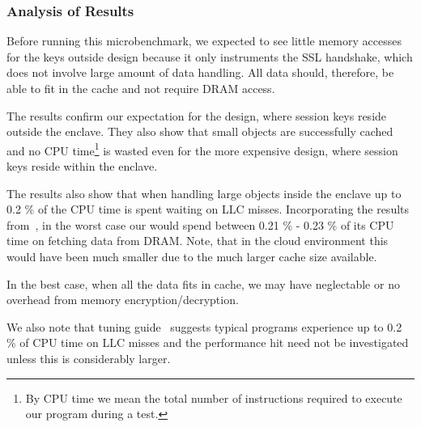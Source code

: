 \documentclass[../../../main.tex]{subfiles}
\begin{document}
\subsubsection*{Analysis of Results}
Before running this microbenchmark, we expected to see little memory
accesses for the keys outside design because it only instruments the SSL
handshake, which does not involve large amount of data handling. All data
should, therefore, be able to fit in the cache and not require DRAM access.

The results confirm our expectation for the design, where session keys reside
outside the enclave. They also show that small objects are successfully cached
and no CPU time\footnote{By CPU time we mean the total number of instructions
required to execute our program during a test.} is wasted even for the more
expensive design, where session keys reside within the enclave.

The results also show that when handling large objects inside the enclave up
to 0.2 \% of the \enclavemodel CPU time is spent waiting on LLC misses.
Incorporating the results from~\cite{REFERENCE}, in the worst case our
\enclaveprogram would spend between 0.21 \% - 0.23 \% of its CPU time on
fetching data from DRAM. Note, that in the cloud environment this would have
been much smaller due to the much larger cache size available.

In the best case, when all the data fits in cache, we may have neglectable or
no overhead from memory encryption/decryption.

We also note that \Intel tuning guide~\cite{intel-eqn} suggests typical
programs experience up to 0.2 \% of CPU time on LLC misses and the performance
hit need not be investigated unless this is considerably larger.
\end{document}
